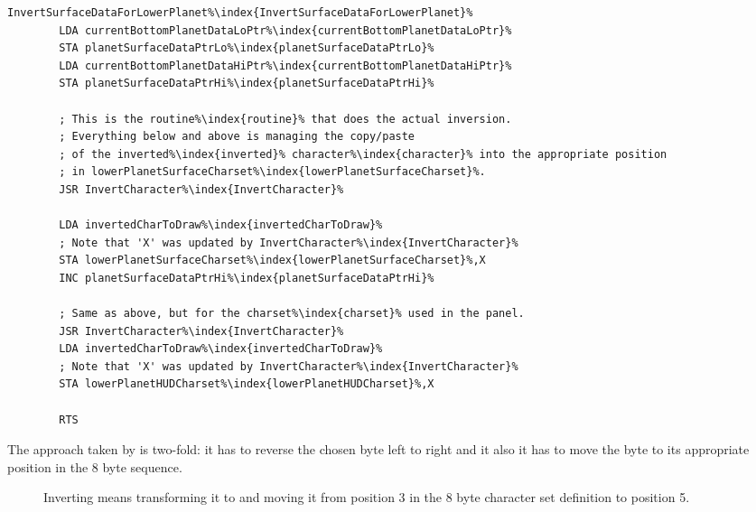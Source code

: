 \begin{lstlisting}[caption=\icode{InvertSurfaceDataForLowerPlanet\index{InvertSurfaceDataForLowerPlanet}}.,escapechar=\%]
InvertSurfaceDataForLowerPlanet%\index{InvertSurfaceDataForLowerPlanet}%
        LDA currentBottomPlanetDataLoPtr%\index{currentBottomPlanetDataLoPtr}%
        STA planetSurfaceDataPtrLo%\index{planetSurfaceDataPtrLo}%
        LDA currentBottomPlanetDataHiPtr%\index{currentBottomPlanetDataHiPtr}%
        STA planetSurfaceDataPtrHi%\index{planetSurfaceDataPtrHi}%

        ; This is the routine%\index{routine}% that does the actual inversion.
        ; Everything below and above is managing the copy/paste
        ; of the inverted%\index{inverted}% character%\index{character}% into the appropriate position
        ; in lowerPlanetSurfaceCharset%\index{lowerPlanetSurfaceCharset}%.
        JSR InvertCharacter%\index{InvertCharacter}%

        LDA invertedCharToDraw%\index{invertedCharToDraw}%
        ; Note that 'X' was updated by InvertCharacter%\index{InvertCharacter}%
        STA lowerPlanetSurfaceCharset%\index{lowerPlanetSurfaceCharset}%,X
        INC planetSurfaceDataPtrHi%\index{planetSurfaceDataPtrHi}%

        ; Same as above, but for the charset%\index{charset}% used in the panel.
        JSR InvertCharacter%\index{InvertCharacter}%
        LDA invertedCharToDraw%\index{invertedCharToDraw}%
        ; Note that 'X' was updated by InvertCharacter%\index{InvertCharacter}%
        STA lowerPlanetHUDCharset%\index{lowerPlanetHUDCharset}%,X

        RTS
\end{lstlisting}

The approach taken by  is two-fold: it has to reverse the chosen byte left to right and 
it also it has to move the byte to its appropriate position in the 8 byte sequence.

\begin{figure}[H]
{
  \setlength{\tabcolsep}{3.0pt}
  \setlength\cmidrulewidth{\heavyrulewidth} %
    \begin{adjustbox}{width=10cm,center}
  \begin{subfigure}{0.3\textwidth}
  
  \end{subfigure}
  \begin{subfigure}{0.3\textwidth}
  
  \end{subfigure}
  \end{adjustbox}
}\caption[]{Inverting  means transforming it to  and moving it from position 3 in the
  8 byte character set definition to position 5.}
\end{figure}

